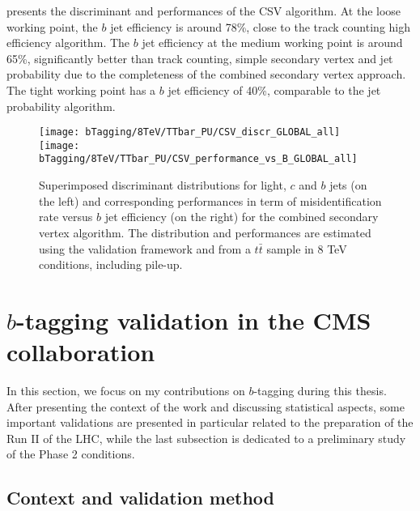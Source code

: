      presents the discriminant and
    performances of the CSV algorithm. At the loose working point, the $b$ jet efficiency is
    around 78\%, close to the track counting high efficiency algorithm. The $b$ jet efficiency
    at the medium working point is around 65\%, significantly better than track counting,
    simple secondary vertex and jet probability due to the completeness of the combined
    secondary vertex approach. The tight working point has a $b$ jet efficiency of 40\%,
    comparable to the jet probability algorithm.

    \begin{figure}[th!]
        \centering
        \begin{minipage}{\textwidth}
        \texttt{[image: bTagging/8TeV/TTbar\_PU/CSV\_discr\_GLOBAL\_all]}
        \texttt{[image: bTagging/8TeV/TTbar\_PU/CSV\_performance\_vs\_B\_GLOBAL\_all]}
        \end{minipage}
        \caption{Superimposed discriminant distributions for light, $c$ and $b$ jets (on
        the left) and corresponding performances in term of misidentification rate versus $b$ jet efficiency
        (on the right) for the combined secondary vertex algorithm.
        The distribution and performances are estimated using the validation framework and from
        a $t\bar{t}$ sample in 8 TeV conditions, including pile-up.}
        \label{fig:bTagging/perfCSV}
    \end{figure}

    \section{$b$-tagging validation in the CMS collaboration \label{sec:bTagValidation}}

    In this section, we focus on my contributions on $b$-tagging during this thesis.
    After presenting the context of the work and discussing statistical aspects, some
    important validations are presented in particular related to the preparation of the
    Run II of the LHC, while the last subsection is dedicated to a preliminary study of
    the Phase 2 conditions.

        \subsection{Context and validation method}

